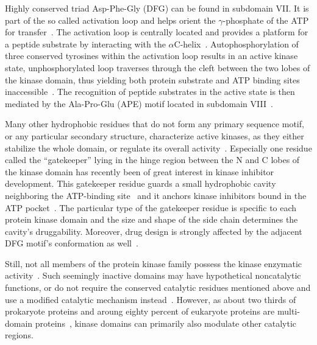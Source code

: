   Highly conserved triad Asp-Phe-Gly (DFG) can be found in subdomain VII.
  It is part of the so called activation loop and helps orient the $\gamma$-phosphate of
  the ATP for transfer~\cite{hanks1995eukaryotic}.
  The activation loop is centrally located and provides a platform for a peptide
  substrate by interacting with the
  $\alpha$C-helix~\cite{huse2002conformational, mobitz2015abc}.
  Autophosphorylation of three conserved tyrosines within the activation loop results in
  an active kinase state, unphosphorylated loop traverses through the cleft between
  the two lobes of the kinase domain, thus yielding both protein substrate and ATP binding
  sites inaccessible~\cite{hubbard1997crystal}.
  The recognition of peptide substrates in the active state is then mediated by the
  Ala-Pro-Glu (APE) motif located in subdomain VIII~\cite{hanks1995eukaryotic}.

  Many other hydrophobic residues that do not form any primary sequence motif, or any
  particular secondary structure, characterize active kinases, as they either stabilize
  the whole domain, or regulate its overall
  activity~\cite{kornev2006surface, kornev2010defining}.
  Especially one residue called the ``gatekeeper'' lying in the hinge region between the N
  and C lobes of the kinase domain has recently been of great interest in kinase inhibitor
  development.
  This gatekeeper residue guards a small hydrophobic cavity neighboring the ATP-binding
  site~\cite{noble2004protein} and it anchors kinase inhibitors bound in the ATP
  pocket~\cite{tong1997highly, azam2008activation}.
  The particular type of the gatekeeper residue is specific to each protein kinase domain
  and the size and shape of the side chain determines the cavity's druggability.
  Moreover, drug design is strongly affected by the adjacent DFG motif's conformation as
  well~\cite{zuccotto2010through}.

  Still, not all members of the protein kinase family possess the kinase enzymatic
  activity~\cite{zervas2002integrin, morrison2001ksr, kroiher2001deceiving}.
  Such seemingly inactive domains may have hypothetical noncatalytic functions, or do not
  require the conserved catalytic residues mentioned above and use a modified catalytic
  mechanism instead~\cite{manning2002protein}.
  However, as about two thirds of prokaryote proteins and aroung eighty percent of
  eukaryote proteins are multi-domain
  proteins~\cite{teichmann1998structural, gerstein1998representative}, kinase domains can
  primarily also modulate other catalytic regions.

